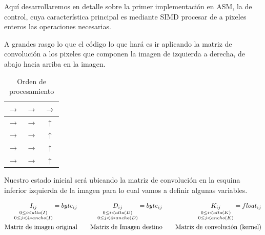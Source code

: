 Aquí desarrollaremos en detalle sobre la primer implementación en ASM, la de
control, cuya característica principal es mediante SIMD procesar de a pixeles
enteros las operaciones necesarias.

A grandes rasgo lo que el código lo que hará es ir aplicando la matriz de convolución a los pixeles que
componen la imagen de izquierda a derecha, de abajo hacia
arriba en la imagen.

\begin{table}[H]
	\centering
	\begin{tabular}{|ccc|}
		\hline
		$\longrightarrow$ & $\longrightarrow$ & $\longrightarrow$ \\ \hline
		$\longrightarrow$ & $\longrightarrow$ & $\uparrow$ \\ \hline
		$\longrightarrow$ & $\longrightarrow$ & $\uparrow$ \\ \hline
		$\longrightarrow$ & $\longrightarrow$ & $\uparrow$ \\ \hline
		$\longrightarrow$ & $\longrightarrow$ & $\uparrow$ \\ \hline
	\end{tabular}
	\caption{Orden de procesamiento}
\end{table}

Nuestro estado inicial será ubicando la matriz de convolución en la esquina
inferior izquierda de la imagen para lo cual vamos a definir algunas variables.

\begin{equation*}
	\begin{aligned}[c]
		\underset{\begin{subarray}{c}
			0 \leq i < alto(I) \\
			0 \leq j < 4*ancho(I)
	\end{subarray}}{I_{ij}} = byte_{ij} \\
	\text{Matriz de imagen original}
	\end{aligned}
	\qquad
	\begin{aligned}[c]
		\underset{\begin{subarray}{c}
			0 \leq i < alto(D) \\
			0 \leq j < 4*ancho(D)
	\end{subarray}}{D_{ij}} = byte_{ij} \\
	\text{Matriz de Imagen destino}
	\end{aligned}
	\qquad
	\begin{aligned}[c]
		\underset{\begin{subarray}{c}
			0 \leq i < alto(K) \\
			0 \leq j < ancho(K)
	\end{subarray}}{K_{ij}} = float_{ij} \\
	\text{Matriz de convolución (kernel)}
	\end{aligned}
\end{equation*}

